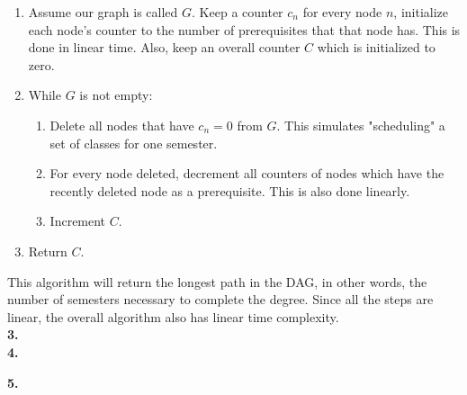 \documentclass[12pt]{report}
\newcommand{\no}{\noindent}
\begin{document}
	\begin{enumerate}
		\item Assume our graph is called $G$. Keep a counter $c_n$ for every node $n$, initialize each node's counter to the number of prerequisites that that node has. This is done in linear time. Also, keep an overall counter $C$ which is initialized to zero.
		\item While $G$ is not empty:
		\begin{enumerate}
			\item Delete all nodes that have $c_n = 0$ from $G$. This simulates "scheduling" a set of classes for one semester.
			\item For every node deleted, decrement all counters of nodes which have the recently deleted node as a prerequisite. This is also done linearly.
			\item Increment $C$.
		\end{enumerate}
		\item Return $C$.
	\end{enumerate} 

	\no This algorithm will return the longest path in the DAG, in other words, the number of semesters necessary to complete the degree. Since all the steps are linear, the overall algorithm also has linear time complexity.\\

	\no \textbf{3.} \\

	\no \textbf{4.}
	
	\no \textbf{5.}
\end{document}
